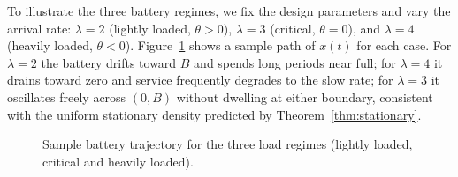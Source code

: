 \documentclass{sig-alternate-per-modified}
\begin{document}

To illustrate the three battery regimes, we fix the design parameters and vary the
arrival rate: $\lambda = 2$ (lightly loaded, $\theta > 0$), $\lambda = 3$ (critical,
$\theta = 0$), and $\lambda = 4$ (heavily loaded, $\theta < 0$). Figure~\ref{fig:paths}
shows a sample path of $x(t)$ for each case. For $\lambda=2$ the battery drifts
toward $B$ and spends long periods near full; for $\lambda=4$ it drains toward zero
and service frequently degrades to the slow rate; for $\lambda=3$ it oscillates
freely across $(0,B)$ without dwelling at either boundary, consistent with the
uniform stationary density predicted by Theorem~\ref{thm:stationary}.

\begin{figure}[t]
  \centering
    \centering
    

    

    

    \caption{Sample battery trajectory for the three load regimes (lightly loaded, critical and heavily loaded).}
  \label{fig:paths}
\end{figure}
\end{document}
